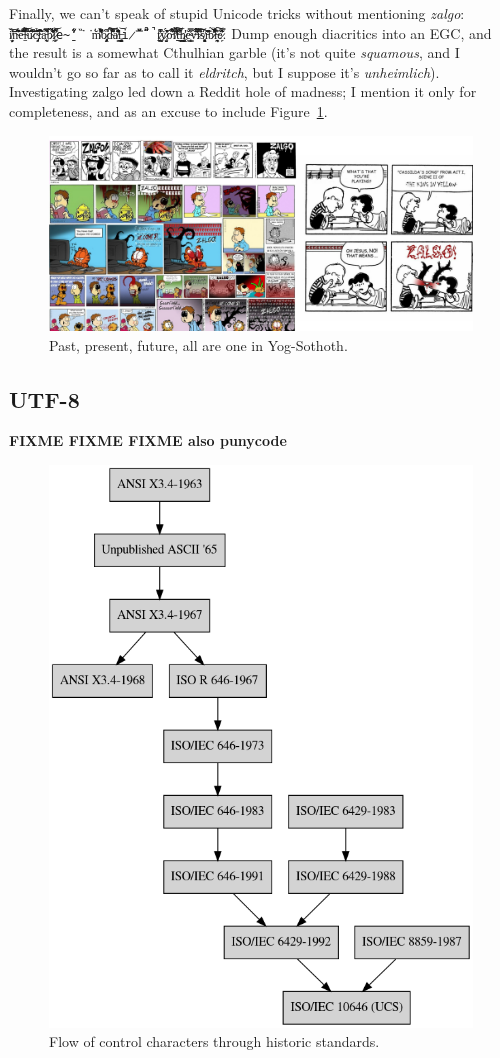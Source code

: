 Finally, we can't speak of stupid Unicode tricks without mentioning
\textit{zalgo}: \texttt{i̸̬̦͙̒̌̓͝n̴͛̓͋̈́͂̇̑̅̕e̵̎̈́̎̀̐̓͆͘͝l̴̠͛͂̃́̅̄̚͝u̷̾́̄̇́̎͂̚͝c̴̡̟̜̉̈́̋͂̈́̎t̵́͊̂̑̑̇̒̃̄å̵̰͎̫̅̿̏͂̽b̷̛͋̎́͛́͋̈͌l̷̰͎̫͐̑̈͛͆͝e̴̱̋̾̃̒̏͘͘̕m̸̆͋͌̍̉͆͌͛̓ȍ̷̡̜̭͙̞̣̎̚d̴̐̃͆̈́̽̔̐̀͝ä̸́̑̐̒͊̔̾́̕l̶̨̡̙̳̭̮̠̼͝i̷̋̆̌̿̎̃̋̚̚ṯ̷̱̫̺͗͒̔͆̄ẏ̷̡̛̮͈͑̓́͊ȏ̵͋̅́̋͒̐̇͝f̸̛̃͐͒̈̾̆̕͠t̶͈̱̠͋̑̊̿̇͘h̷̰͚̳̳̤͗̓͗̄e̴͇͙̜̿͐́̎̌͘ṽ̶̌̈́́́̈́͌͂͘i̷̛͊̒̏̄̀̅͠͝s̸̯̘͍̝͓̈́ͅͅì̵̃͊̇͗̄̋̇͘b̷̃̎̓͛̊̾͘̚̚l̶̯̼͎͉̎͛̆͠e̷̙͊̇̿͗̃͊̓́}. Dump enough
diacritics into an EGC, and the result is a somewhat Cthulhian garble (it's not
quite \textit{squamous}, and I wouldn't go so far as to call it
\textit{eldritch}, but I suppose it's \textit{unheimlich}). Investigating zalgo
led down a Reddit hole of madness; I mention it only for completeness, and as
an excuse to include Figure~\ref{fig:zalgo}.

\begin{figure}[H]
    \centering
    \includegraphics[width=.5\linewidth]{media/zalgo.png}
    \caption{Past, present, future, all are one in Yog-Sothoth.}
    \label{fig:zalgo}
\end{figure}

\subsection{UTF-8}
\textbf{FIXME FIXME FIXME also punycode}

\begin{figure}[!htb]
    \centering
    \includegraphics[width=.75\linewidth]{media/control-char-standards.png}
    \caption{Flow of control characters through historic standards.}
\end{figure}

\cleardoublepage
